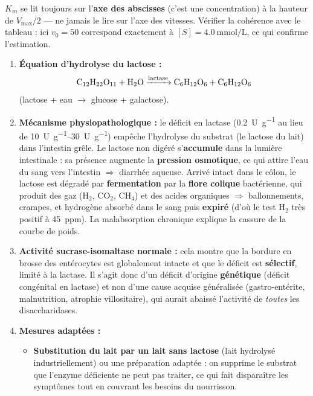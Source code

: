\documentclass[11pt]{article}
\newcommand{\cle}[1]{{\popxbold\color{popdark}#1}}
\begin{document}
\begin{attention}
$K_m$ se lit toujours sur l'\textbf{axe des abscisses} (c'est une concentration) à la hauteur de $V_{\text{max}}/2$ — ne jamais le lire sur l'axe des vitesses. Vérifier la cohérence avec le tableau : ici $v_0 = 50$ correspond exactement à $[S] = \SI{4,0}{\mmol\per\liter}$, ce qui confirme l'estimation.
\end{attention}

\begin{corrige}
\begin{enumerate}
    \item \textbf{Équation d'hydrolyse du lactose :}
    \[ \ce{C12H22O11 + H2O ->[lactase] C6H12O6 + C6H12O6} \]
    (lactose + eau $\rightarrow$ glucose + galactose).
    \item \textbf{Mécanisme physiopathologique :} le déficit en lactase (\SI{0,2}{U.g^{-1}} au lieu de \SIrange{10}{30}{U.g^{-1}}) empêche l'hydrolyse du \cle{substrat} (le lactose du lait) dans l'intestin grêle. Le lactose non digéré s'\textbf{accumule} dans la lumière intestinale : sa présence augmente la \textbf{pression osmotique}, ce qui attire l'eau du sang vers l'intestin $\Rightarrow$ diarrhée aqueuse. Arrivé intact dans le côlon, le lactose est dégradé par \textbf{fermentation} par la \textbf{flore colique} bactérienne, qui produit des gaz (H$_2$, CO$_2$, CH$_4$) et des acides organiques $\Rightarrow$ ballonnements, crampes, et hydrogène absorbé dans le sang puis \textbf{expiré} (d'où le test H$_2$ très positif à \SI{45}{ppm}). La malabsorption chronique explique la cassure de la courbe de poids.
    \item \textbf{Activité sucrase-isomaltase normale :} cela montre que la bordure en brosse des entérocytes est globalement intacte et que le déficit est \textbf{sélectif}, limité à la lactase. Il s'agit donc d'un déficit d'origine \textbf{génétique} (déficit congénital en lactase) et non d'une cause acquise généralisée (gastro-entérite, malnutrition, atrophie villositaire), qui aurait abaissé l'activité de \emph{toutes} les disaccharidases.
    \item \textbf{Mesures adaptées :}
    \begin{itemize}
        \item \textbf{Substitution du lait par un lait sans lactose} (lait hydrolysé industriellement) ou une préparation adaptée : on supprime le substrat que l'enzyme déficiente ne peut pas traiter, ce qui fait disparaître les symptômes tout en couvrant les besoins du nourrisson.

\end{itemize}
\end{enumerate}
\end{corrige}
\end{document}
